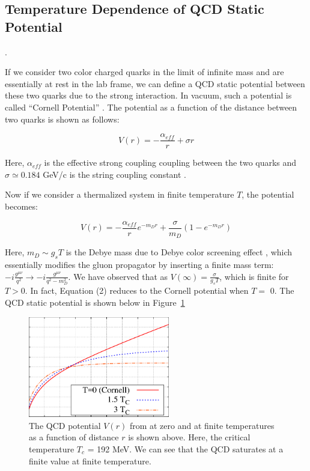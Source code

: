 \subsection{Temperature Dependence of QCD Static Potential}. 

If we consider two color charged quarks in the limit of infinite mass and are essentially at rest in the lab frame, we can define a QCD static potential between these two quarks due to the strong interaction. In vacuum, such a potential is called ``Cornell Potential'' \cite{Cornell}. The potential as a function of the distance between two quarks is shown as follows:

\begin{equation}
V(r) = -\frac{\alpha_{eff}}{r} + \sigma r
\end{equation}

Here, $\alpha_{eff}$ is the effective strong coupling coupling between the two quarks and $\sigma \simeq 0.184$ GeV/c is the string coupling constant \cite{CornellEquation}. 

Now if we consider a thermalized system in finite temperature $T$, the potential becomes: 

\begin{equation}
V(r) = -\frac{\alpha_{eff}}{r} e^{-m_D r} + \frac{\sigma}{m_D} (1 - e^{-m_D r})
\end{equation}

Here, $m_D \sim g_s T$ is the Debye mass due to Debye color screening effect \cite{CSEff}, which essentially modifies the gluon propagator by inserting a finite mass term: $-i \frac{g^{\mu\nu}}{q^2} \rightarrow -i \frac{g^{\mu\nu}}{q^2 - m_D^2}$. We have observed that as $V(\infty) = \frac{\sigma}{g_sT}$, which is finite for $T>$0. In fact, Equation (2) reduces to the Cornell potential when $T =$ 0. The QCD static potential is shown below in Figure~\ref{QCDPotential} \cite{TDepCornell}


\begin{figure}[hbtp]
\begin{center}
\includegraphics[width=0.55\textwidth]{Figures/Chapter1/QCDPotential.png}
\caption{The QCD potential $V(r)$ from at zero and at finite temperatures as a function of distance $r$ is shown above. Here, the critical temperature $T_c $ = 192 MeV. We can see that the QCD saturates at a finite value at finite temperature. }
\label{QCDPotential}
\end{center}
\end{figure} 


